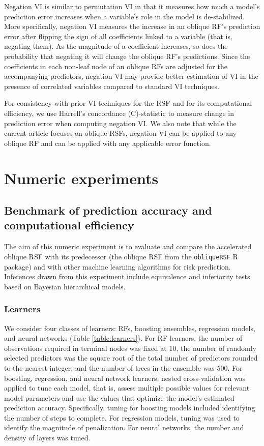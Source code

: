 \documentclass[twoside,11pt]{article}\usepackage[]{graphicx}\usepackage[]{xcolor}
\newcommand{\ie}{that is}
\begin{document}
Negation VI is similar to permutation VI in that it measures how much a model’s prediction error increases when a variable’s role in the model is de-stabilized. More specifically, negation VI measures the increase in an oblique RF's prediction error after flipping the sign of all coefficients linked to a variable (\ie, negating them). As the magnitude of a coefficient increases, so does the probability that negating it will change the oblique RF's predictions. Since the coefficients in each non-leaf node of an oblique RFs are adjusted for the accompanying predictors, negation VI may provide better estimation of VI in the presence of correlated variables compared to standard VI techniques.

For consistency with prior VI techniques for the RSF and for its computational efficiency, we use Harrell's concordance (C)-statistic \citep{harrell1982evaluating} to measure change in prediction error when computing negation VI. We also note that while the current article focuses on oblique RSFs, negation VI can be applied to any oblique RF and can be applied with any applicable error function.

\section{Numeric experiments}

\subsection{Benchmark of prediction accuracy and computational efficiency}

The aim of this numeric experiment is to evaluate and compare the accelerated oblique RSF with its predecessor (the oblique RSF from the \texttt{obliqueRSF} R package) and with other machine learning algorithms for risk prediction. Inferences drawn from this experiment include equivalence and inferiority tests based on Bayesian hierarchical models.

\subsubsection{Learners} \label{sec:learners}

We consider four classes of learners: RFs, boosting ensembles, regression models, and neural networks (Table \ref{table:learners}). For RF learners, the number of observations required in terminal nodes was fixed at 10, the number of randomly selected predictors was the square root of the total number of predictors rounded to the nearest integer, and the number of trees in the ensemble was 500. For boosting, regression, and neural network learners, nested cross-validation was applied to tune each model, \ie, assess multiple possible values for relevant model parameters and use the values that optimize the model's estimated prediction accuracy. Specifically, tuning for boosting models included identifying the number of steps to complete. For regression models, tuning was used to identify the magnitude of penalization. For neural networks, the number and density of layers was tuned.
\end{document}
